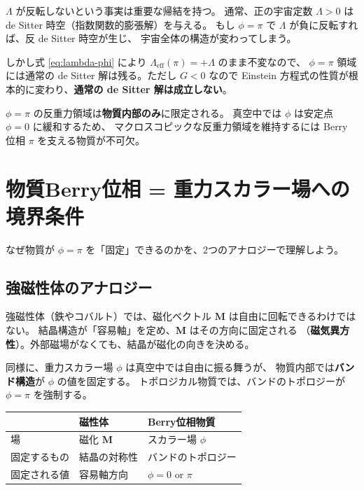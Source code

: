 $\Lambda$ が反転しないという事実は重要な帰結を持つ。
通常、正の宇宙定数 $\Lambda > 0$ は de Sitter 時空（指数関数的膨張解）を与える。
もし $\phi = \pi$ で $\Lambda$ が負に反転すれば、反 de Sitter 時空が生じ、
宇宙全体の構造が変わってしまう。

しかし式 \eqref{eq:lambda-phi} により $\Lambda_{\mathrm{eff}}(\pi) = +\Lambda$ のまま不変なので、
$\phi = \pi$ 領域には通常の de Sitter 解は残る。ただし $G < 0$ なので
Einstein 方程式の性質が根本的に変わり、\textbf{通常の de Sitter 解は成立しない}。

\begin{warningbox}[局所限定の原理]
$\phi = \pi$ の反重力領域は\textbf{物質内部のみ}に限定される。
真空中では $\phi$ は安定点 $\phi = 0$ に緩和するため、
マクロスコピックな反重力領域を維持するには Berry 位相 $\pi$ を支える物質が不可欠。
\end{warningbox}

\section{物質Berry位相 = 重力スカラー場への境界条件}
\label{sec:11.3}

なぜ物質が $\phi = \pi$ を「固定」できるのかを、2つのアナロジーで理解しよう。

\subsection{強磁性体のアナロジー}

強磁性体（鉄やコバルト）では、磁化ベクトル $\mathbf{M}$ は自由に回転できるわけではない。
結晶構造が「容易軸」を定め、$\mathbf{M}$ はその方向に固定される
（\textbf{磁気異方性}）。外部磁場がなくても、結晶が磁化の向きを決める。

同様に、重力スカラー場 $\phi$ は真空中では自由に振る舞うが、
物質内部では\textbf{バンド構造}が $\phi$ の値を固定する。
トポロジカル物質では、バンドのトポロジーが $\phi = \pi$ を強制する。

\begin{center}
\begin{tabular}{lll}
\toprule
& 磁性体 & Berry位相物質 \\
\midrule
場 & 磁化 $\mathbf{M}$ & スカラー場 $\phi$ \\
固定するもの & 結晶の対称性 & バンドのトポロジー \\
固定される値 & 容易軸方向 & $\phi = 0$ or $\pi$ \\
\bottomrule
\end{tabular}
\end{center}

